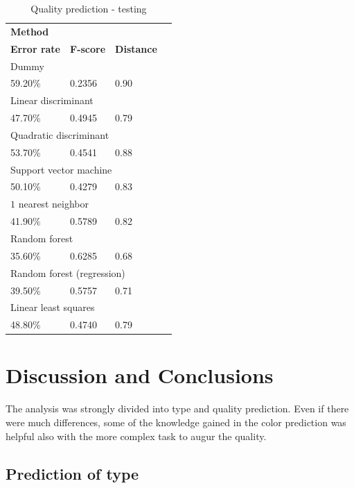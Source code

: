 \documentclass[twoside]{article}
\begin{document}
\begin{multicols}{2}
\begin{table}[H]
\caption{Quality prediction - testing}
\label{table:quality_testing}
\centering
\begin{tabular}{llll}
\multicolumn{3}{l}{\textbf{Method}} \\
\textbf{Error rate} & \textbf{F-score} & \textbf{Distance} \\
\midrule
\multicolumn{3}{l}{Dummy} \\
59.20\% & 0.2356 & 0.90 \\
\multicolumn{3}{l}{Linear discriminant} \\
47.70\% & 0.4945 & 0.79 \\
\multicolumn{3}{l}{Quadratic discriminant} \\
53.70\% & 0.4541 & 0.88 \\
\multicolumn{3}{l}{Support vector machine} \\
50.10\% & 0.4279 & 0.83 \\
\multicolumn{3}{l}{$1$ nearest neighbor} \\
41.90\% & 0.5789 & 0.82 \\
\multicolumn{3}{l}{Random forest} \\
35.60\% & 0.6285 & 0.68 \\
\multicolumn{3}{l}{Random forest (regression)} \\
39.50\% & 0.5757 & 0.71 \\
\multicolumn{3}{l}{Linear least squares} \\
48.80\% & 0.4740 & 0.79 \\
\end{tabular}
\end{table}


\section{Discussion and Conclusions}

The analysis was strongly divided into type and quality prediction.
Even if there were much differences, some of the knowledge gained in the color prediction
was helpful also with the more complex task to augur the quality.

\subsection{Prediction of type}


\end{multicols}
\end{document}
